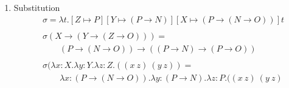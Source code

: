 \documentclass{article}
\begin{document}
\begin{enumerate}
\begin{enumerate}
        \item Substitution
          \begin{align*}
            & \sigma = \lambda t.[Z \mapsto P][Y \mapsto (P \rightarrow N)][X \mapsto (P \rightarrow (N \rightarrow O))]t \\ \\
            & \sigma(X \rightarrow (Y \rightarrow (Z \rightarrow O))) = \\
            & \qquad (P \rightarrow (N \rightarrow O)) \rightarrow ((P \rightarrow N) \rightarrow (P \rightarrow O)) \\ \\
            & \sigma(\lambda x:X.\lambda y:Y.\lambda z:Z.((x\ z)\ (y\ z)) = \\
            & \qquad \lambda x:(P \rightarrow (N \rightarrow O)).
                     \lambda y:(P \rightarrow N).
                     \lambda z:P.((x\ z)\ (y\ z)
          \end{align*}
        \end{enumerate}
  \end{enumerate}
\end{document}
